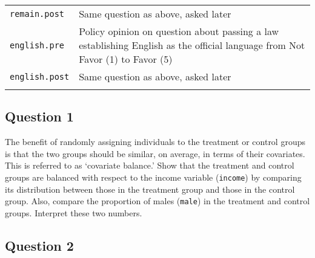 \documentclass[]{article}
\begin{document}
\begin{longtable}[c]{@{}ll@{}}
\\\addlinespace
\begin{minipage}[t]{0.25\columnwidth}\raggedright
\texttt{remain.post}
\end{minipage} & \begin{minipage}[t]{0.68\columnwidth}\raggedright
Same question as above, asked later
\end{minipage}
\\\addlinespace
\begin{minipage}[t]{0.25\columnwidth}\raggedright
\texttt{english.pre}
\end{minipage} & \begin{minipage}[t]{0.68\columnwidth}\raggedright
Policy opinion on question about passing a law establishing English as
the official language from Not Favor (1) to Favor (5)
\end{minipage}
\\\addlinespace
\begin{minipage}[t]{0.25\columnwidth}\raggedright
\texttt{english.post}
\end{minipage} & \begin{minipage}[t]{0.68\columnwidth}\raggedright
Same question as above, asked later
\end{minipage}
\\\addlinespace
\bottomrule
\end{longtable}

\subsection{Question 1}\label{question-1}

The benefit of randomly assigning individuals to the treatment or
control groups is that the two groups should be similar, on average, in
terms of their covariates. This is referred to as `covariate balance.'
Show that the treatment and control groups are balanced with respect to
the income variable (\texttt{income}) by comparing its distribution
between those in the treatment group and those in the control group.
Also, compare the proportion of males (\texttt{male}) in the treatment
and control groups. Interpret these two numbers.

\subsection{Question 2}\label{question-2}
\end{document}
